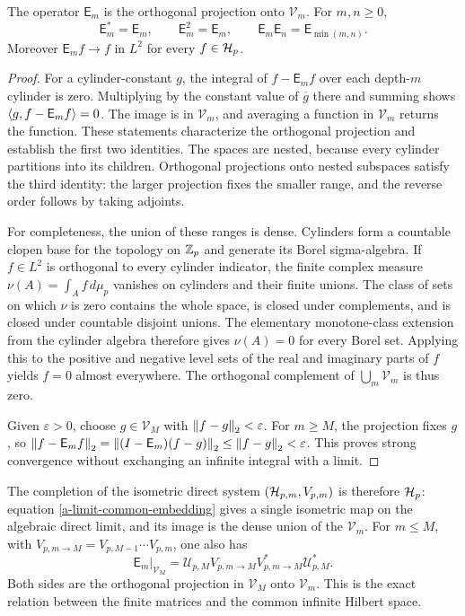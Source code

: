 \begin{proposition}
\label{a-limit-expectation-algebra}
The operator $\mathsf E_m$ is the orthogonal projection onto $\mathcal V_m$.
For $m,n\geq0$,
\begin{equation}
 \mathsf E_m^*=\mathsf E_m,\qquad
 \mathsf E_m^2=\mathsf E_m,\qquad
 \mathsf E_m\mathsf E_n=\mathsf E_{\min(m,n)}.
 \label{a-limit-projection-product}
\end{equation}
Moreover $\mathsf E_m f\to f$ in $L^2$ for every $f\in\mathcal H_p$.
\end{proposition}
\begin{proof}
For a cylinder-constant $g$, the integral of $f-\mathsf E_m f$ over each
depth-$m$ cylinder is zero. Multiplying by the constant value of
$\overline g$ there and summing shows
$\left\langle g,f-\mathsf E_mf\right\rangle=0$. The image is in $\mathcal V_m$, and averaging
a function in $\mathcal V_m$ returns the function. These statements
characterize the orthogonal projection and establish the first two
identities. The spaces are nested, because every cylinder partitions into
its children. Orthogonal projections onto nested subspaces satisfy the
third identity: the larger projection fixes the smaller range, and the
reverse order follows by taking adjoints.

For completeness, the union of these ranges is dense. Cylinders form a
countable clopen base for the topology on $\mathbb Z_p$ and generate its Borel
sigma-algebra. If $f\in L^2$ is orthogonal to every cylinder indicator,
the finite complex measure $\nu(A)=\int_A f\,d\mu_p$ vanishes on
cylinders and their finite unions. The class of sets on which $\nu$ is
zero contains the whole space, is closed under complements, and is
closed under countable disjoint unions. The elementary monotone-class
extension from the cylinder algebra therefore gives $\nu(A)=0$ for every
Borel set. Applying this to the positive and negative level sets of the
real and imaginary parts of $f$ yields $f=0$ almost everywhere.
The orthogonal complement of $\bigcup_m\mathcal V_m$ is thus zero.

Given $\varepsilon>0$, choose $g\in\mathcal V_M$ with
$\left\lVert f-g\right\rVert_2<\varepsilon$. For $m\geq M$, the projection fixes $g$, so
$\left\lVert f-\mathsf E_m f\right\rVert_2
=\left\lVert(I-\mathsf E_m)(f-g)\right\rVert_2\leq\left\lVert f-g\right\rVert_2<\varepsilon$.
This proves strong convergence without exchanging an infinite integral
with a limit.
\end{proof}

The completion of the isometric direct system
$(\mathcal H_{p,m},V_{p,m})$ is therefore $\mathcal H_p$: equation
\eqref{a-limit-common-embedding} gives a single isometric map on the
algebraic direct limit, and its image is the dense union of the
$\mathcal V_m$. For $m\leq M$, with
$V_{p,m\to M}=V_{p,M-1}\cdots V_{p,m}$, one also has
\begin{equation}
 \mathsf E_m\big|_{\mathcal V_M}
 =\mathcal U_{p,M}V_{p,m\to M}V_{p,m\to M}^*
 \mathcal U_{p,M}^*.
 \label{a-limit-finite-projection}
\end{equation}
Both sides are the orthogonal projection in $\mathcal V_M$ onto
$\mathcal V_m$. This is the exact relation between the finite matrices
and the common infinite Hilbert space.

